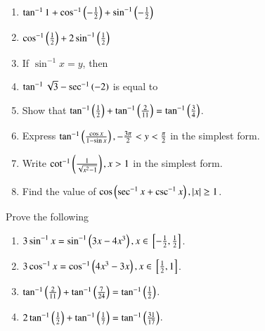 \begin{enumerate}[label=\thesubsection.\arabic*,ref=\thesubsection.\theenumi,resume*,itemsep=1ex]
	\item $\tan^{-1}1+\cos^{-1}\left(-\frac{1}{2}\right)+\sin^{-1}\left(-\frac{1}{2}\right)$
	\item $\cos^{-1}\left(\frac{1}{2}\right)+2\sin^{-1}\left(\frac{1}{2}\right)$
	\item If $\sin^{-1}x = y$, then
\begin{enumerate}
\end{enumerate}
	\item $\tan^{-1}\sqrt{3}-\sec^{-1}\left(-{2}\right)$ is equal to
\begin{enumerate}
\end{enumerate}
	\item Show that $\tan^{-1}\left(\frac{1}{2}\right)+\tan^{-1}\left(\frac{2}{11}\right)=\tan^{-1}\left(\frac{3}{4}\right)$.
	\item Express 
		$\tan^{-1}\left(\frac{\cos x}{1-\sin x}\right),
-\frac{3\pi}{2} < y < \frac{\pi}{2}$
		in the simplest form.
	\item Write
		$\cot^{-1}\left(\frac{1}{\sqrt{x^2-1}}\right),
x > 1$
		in the simplest form.
	\item Find the value of
		$\cos\left(\sec^{-1}x +\csc^{-1}x\right),
		\left\vert x\right\vert \ge 1$.
\end{enumerate}
Prove the following
\begin{enumerate}[label=\thesubsection.\arabic*,ref=\thesubsection.\theenumi,resume*,itemsep=1ex]
	\item 
		$3\sin^{-1}x =\sin^{-1}\left(3x-4x^3\right),
		x \in {}\left[-\frac{1}{2},\frac{1}{2}\right]$.
	\item 
		$3\cos^{-1}x =\cos^{-1}\left(4x^3-3x\right),
		x \in {}\left[\frac{1}{2},{1}\right]$.
	\item $\tan^{-1}\left(\frac{2}{11}\right)+\tan^{-1}\left(\frac{7}{24}\right)=\tan^{-1}\left(\frac{1}{2}\right)$.
	\item $2\tan^{-1}\left(\frac{1}{2}\right)+\tan^{-1}\left(\frac{1}{7}\right)=\tan^{-1}\left(\frac{31}{17}\right)$.
\end{enumerate}
